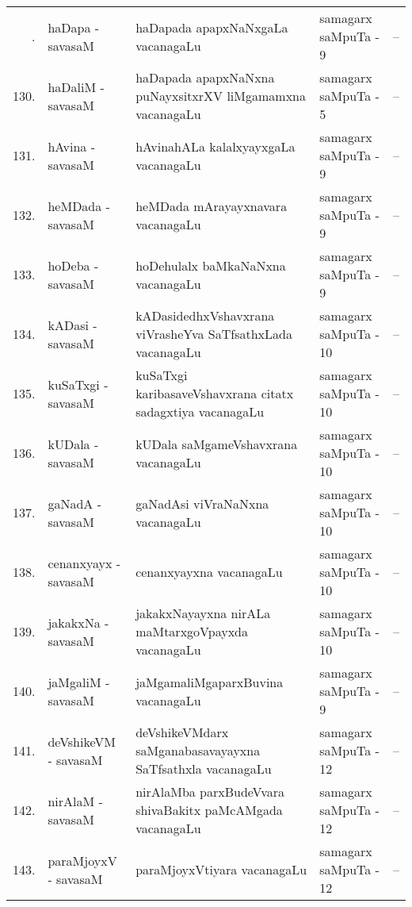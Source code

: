 \smallskip
{\renewcommand{\arraystretch}{1.35}
\begin{longtable}{rl>{\raggedright}p{5.5cm}lc}
\endfirsthead
\endhead
\endfoot
\endlastfoot
129. & haDapa - savasaM & haDapada apapxNaNxgaLa vacanagaLu & samagarx saMpuTa - 9 & --\\
130. & haDaliM - savasaM & haDapada apapxNaNxna puNayxsitxrXV liMgamamxna\newline \phantom{AA} vacanagaLu & samagarx saMpuTa - 5 & --\\
131. & hAvina - savasaM & hAvinahALa kalalxyayxgaLa vacanagaLu & samagarx saMpuTa - 9 & --\\
132. & heMDada - savasaM & heMDada mArayayxnavara vacanagaLu & samagarx saMpuTa - 9 & --\\
133. & hoDeba - savasaM & hoDehulalx baMkaNaNxna vacanagaLu & samagarx saMpuTa - 9 & --\\
134. &  kADasi - savasaM & kADasidedhxVshavxrana viVrasheYva SaTfsathxLada\newline \phantom{AA} vacanagaLu & samagarx saMpuTa - 10 & --\\
135. & kuSaTxgi - savasaM & kuSaTxgi karibasaveVshavxrana citatx sadagxtiya\newline \phantom{AA} vacanagaLu & samagarx saMpuTa - 10 & --\\
136. & kUDala - savasaM & kUDala saMgameVshavxrana vacanagaLu & samagarx saMpuTa - 10 & --\\
137. & gaNadA - savasaM & gaNadAsi viVraNaNxna vacanagaLu & samagarx saMpuTa - 10 & --\\
138. & cenanxyayx - savasaM & cenanxyayxna vacanagaLu & samagarx saMpuTa - 10 & --\\
139. & jakakxNa - savasaM & jakakxNayayxna nirALa maMtarxgoVpayxda\newline \phantom{AA} vacanagaLu & samagarx saMpuTa - 10 & --\\
140. & jaMgaliM - savasaM & jaMgamaliMgaparxBuvina vacanagaLu & samagarx saMpuTa - 9 & --\\
141. & deVshikeVM - savasaM & deVshikeVMdarx saMganabasavayayxna\newline \phantom{AA} SaTfsathxla vacanagaLu & samagarx saMpuTa - 12 & --\\
142. & nirAlaM - savasaM & nirAlaMba parxBudeVvara shivaBakitx\newline \phantom{AA} paMcAMgada vacanagaLu & samagarx saMpuTa - 12 & --\\
143. & paraMjoyxV - savasaM & paraMjoyxVtiyara vacanagaLu & samagarx saMpuTa - 12 & --\\

\end{longtable}}
